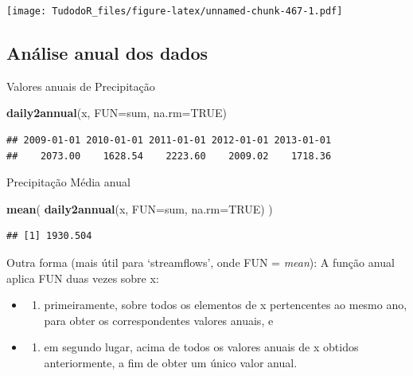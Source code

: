 \documentclass[
]{book}
\newenvironment{Shaded}{\begin{snugshade}}{\end{snugshade}}
\newcommand{\DataTypeTok}[1]{\textcolor[rgb]{0.13,0.29,0.53}{#1}}
\newcommand{\KeywordTok}[1]{\textcolor[rgb]{0.13,0.29,0.53}{\textbf{#1}}}
\newcommand{\NormalTok}[1]{#1}
\newcommand{\OtherTok}[1]{\textcolor[rgb]{0.56,0.35,0.01}{#1}}
\providecommand{\tightlist}{%
  \setlength{\itemsep}{0pt}\setlength{\parskip}{0pt}}
\begin{document}
\texttt{[image: TudodoR\_files/figure-latex/unnamed-chunk-467-1.pdf]}

\hypertarget{anuxe1lise-anual-dos-dados}{%
\subsection{Análise anual dos dados}\label{anuxe1lise-anual-dos-dados}}

Valores anuais de Precipitação

\begin{Shaded}
\begin{Highlighting}[]
\KeywordTok{daily2annual}\NormalTok{(x, }\DataTypeTok{FUN=}\NormalTok{sum, }\DataTypeTok{na.rm=}\OtherTok{TRUE}\NormalTok{)}
\end{Highlighting}
\end{Shaded}

\begin{verbatim}
## 2009-01-01 2010-01-01 2011-01-01 2012-01-01 2013-01-01 
##    2073.00    1628.54    2223.60    2009.02    1718.36
\end{verbatim}

Precipitação Média anual

\begin{Shaded}
\begin{Highlighting}[]
\KeywordTok{mean}\NormalTok{( }\KeywordTok{daily2annual}\NormalTok{(x, }\DataTypeTok{FUN=}\NormalTok{sum, }\DataTypeTok{na.rm=}\OtherTok{TRUE}\NormalTok{) )}
\end{Highlighting}
\end{Shaded}

\begin{verbatim}
## [1] 1930.504
\end{verbatim}

Outra forma (mais útil para `streamflows', onde FUN = \emph{mean}): A função anual aplica FUN duas vezes sobre x:

\begin{itemize}
\item
  \begin{enumerate}
  \def\labelenumi{(\roman{enumi})}
  \tightlist
  \item
    primeiramente, sobre todos os elementos de x pertencentes ao mesmo ano, para obter os correspondentes valores anuais, e
  \end{enumerate}
\item
  \begin{enumerate}
  \def\labelenumi{(\roman{enumi})}
  \setcounter{enumi}{1}
  \tightlist
  \item
    em segundo lugar, acima de todos os valores anuais de x obtidos anteriormente, a fim de obter um único valor anual.
  \end{enumerate}
\end{itemize}
\end{document}
